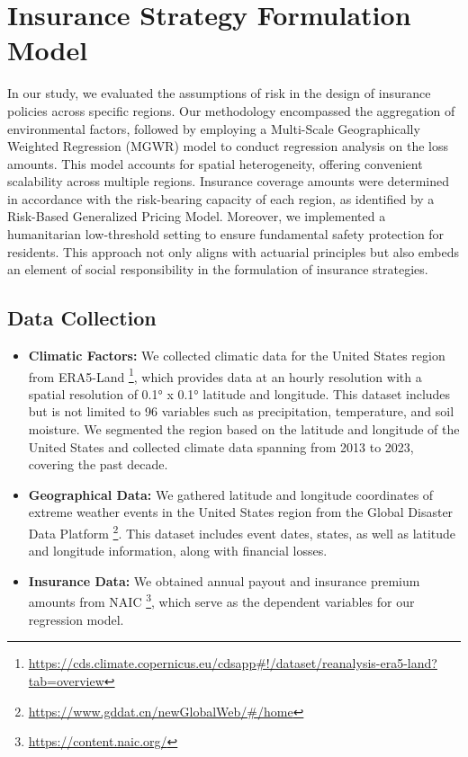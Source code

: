 \documentclass[12pt]{article}
\begin{document}
\section{Insurance Strategy Formulation Model}
In our study, we evaluated the assumptions of risk in the design of insurance policies across specific regions. Our methodology encompassed the aggregation of environmental factors, followed by employing a Multi-Scale Geographically Weighted Regression (MGWR) model to conduct regression analysis on the loss amounts. This model accounts for spatial heterogeneity, offering convenient scalability across multiple regions. Insurance coverage amounts were determined in accordance with the risk-bearing capacity of each region, as identified by a Risk-Based Generalized Pricing Model. Moreover, we implemented a humanitarian low-threshold setting to ensure fundamental safety protection for residents. This approach not only aligns with actuarial principles but also embeds an element of social responsibility in the formulation of insurance strategies.
\subsection{Data Collection}
\begin{itemize}
\item \textbf{Climatic Factors:} We collected climatic data for the United States region from ERA5-Land \footnote{\url{https://cds.climate.copernicus.eu/cdsapp#!/dataset/reanalysis-era5-land?tab=overview}}, which provides data at an hourly resolution with a spatial resolution of 0.1° x 0.1° latitude and longitude. This dataset includes but is not limited to 96 variables such as precipitation, temperature, and soil moisture. We segmented the region based on the latitude and longitude of the United States and collected climate data spanning from 2013 to 2023, covering the past decade.
\item \textbf{Geographical Data:} We gathered latitude and longitude coordinates of extreme weather events in the United States region from the Global Disaster Data Platform \footnote{\url{https://www.gddat.cn/newGlobalWeb/#/home}}. This dataset includes event dates, states, as well as latitude and longitude information, along with financial losses.
\item \textbf{Insurance Data:} We obtained annual payout and insurance premium amounts from NAIC \footnote{\url{https://content.naic.org/}}, which serve as the dependent variables for our regression model.
\end{itemize}
\end{document}
